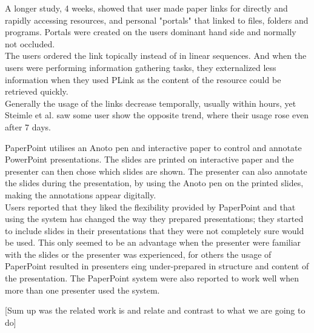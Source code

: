 A longer study, 4 weeks, showed that user made paper links for directly and rapidly accessing resources, and personal "portals" that linked to files, folders and programs. Portals were created on the users dominant hand side and normally not occluded. \\
The users ordered the link topically instead of in linear sequences. And when the users were performing information gathering tasks, they externalized less information when they used PLink as the content of the resource could be retrieved quickly. \\
Generally the usage of the links decrease temporally, usually within hours, yet Steimle et al. saw some user show the opposite trend, where their usage rose even after 7 days. \par

PaperPoint \cite{Signer:2007:PPP:1226969.1226981} utilises an Anoto\cite{anoto2011anoto} pen and interactive paper to control and annotate PowerPoint  presentations. The slides are printed on interactive paper and the presenter can then chose which slides are shown. The presenter can also annotate the slides during the presentation, by using the Anoto pen on the printed slides, making the annotations appear digitally. \\

Users reported that they liked the flexibility provided by PaperPoint and that using the system has changed the way they prepared presentations; they started to include slides in their presentations that they were not completely sure would be used. This only seemed to be an advantage when the presenter were familiar with the slides or the presenter was experienced, for others the usage of PaperPoint resulted in presenters eing under-prepared in structure and content of the presentation. The PaperPoint system were also reported to work well when more than one presenter used the system.\\

\par






[Sum up was the related work is and relate and contrast to what we are going to do]


